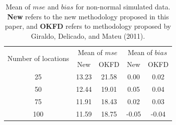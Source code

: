 \documentclass[12pt,]{article}
\theoremstyle{definition}
\theoremstyle{definition}
\theoremstyle{definition}
\theoremstyle{remark}
\begin{document}
\begin{table}[htbp]
  \centering
  \caption{Mean of $mse$ and $bias$ for non-normal simulated data. \textbf{New} refers to the new methodology proposed in this paper, and \textbf{OKFD} refers to methodology proposed by Giraldo, Delicado, and Mateu (2011).}
    \begin{tabular}{ccc|cc}
    \toprule
    \multirow{2}{*}{Number of locations} & \multicolumn{2}{c}{Mean of $mse$} & \multicolumn{2}{|c}{Mean of $bias$} \\ \cmidrule{2-5}
          & New   & OKFD  & New   & OKFD \\  \midrule
    25    & 13.23 & 21.58 & 0.00  & 0.02 \\
    50    & 12.44 & 19.01 & 0.05  & 0.04 \\
    75    & 11.91 & 18.43 & 0.02  & 0.03 \\
    100   & 11.59 & 18.75 & -0.05 & -0.04 \\ \bottomrule
    \end{tabular}
  \label{tab:summary-nonnormal}
\end{table}
\end{document}
